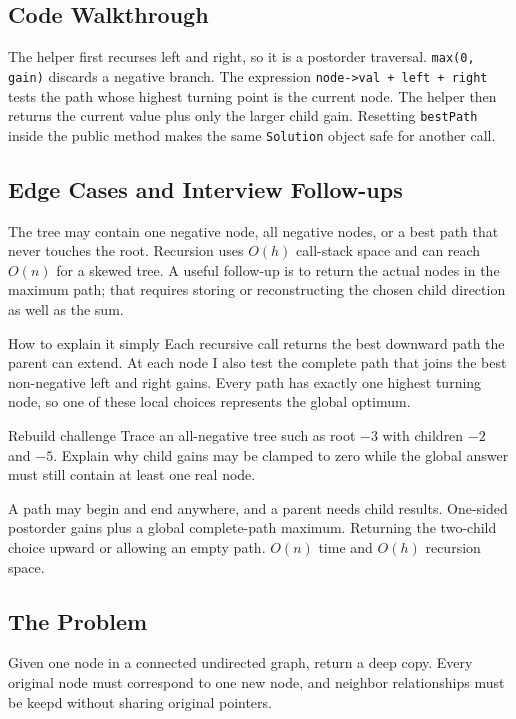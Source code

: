 \subsection{Code Walkthrough}
The helper first recurses left and right, so it is a postorder traversal.
\texttt{max(0, gain)} discards a negative branch. The expression
\texttt{node->val + left + right} tests the path whose highest turning point
is the current node. The helper then returns the current value plus only the
larger child gain. Resetting \texttt{bestPath} inside the public method makes
the same \texttt{Solution} object safe for another call.

\subsection{Edge Cases and Interview Follow-ups}
The tree may contain one negative node, all negative nodes, or a best path
that never touches the root. Recursion uses \(O(h)\) call-stack space and can
reach \(O(n)\) for a skewed tree. A useful follow-up is to return the actual
nodes in the maximum path; that requires storing or reconstructing the chosen
child direction as well as the sum.

\begin{revisionbox}{How to explain it simply}
Each recursive call returns the best downward path the parent can extend. At
each node I also test the complete path that joins the best non-negative left
and right gains. Every path has exactly one highest turning node, so one of
these local choices represents the global optimum.
\end{revisionbox}

\begin{revisionbox}{Rebuild challenge}
Trace an all-negative tree such as root \(-3\) with children \(-2\) and
\(-5\). Explain why child gains may be clamped to zero while the global answer
must still contain at least one real node.
\end{revisionbox}
\chaptercheckpoint
  {A path may begin and end anywhere, and a parent needs child results.}
  {One-sided postorder gains plus a global complete-path maximum.}
  {Returning the two-child choice upward or allowing an empty path.}
  {$O(n)$ time and $O(h)$ recursion space.}
\judgeclassnote



\subsection{The Problem}
Given one node in a connected undirected graph, return a deep copy. Every
original node must correspond to one new node, and neighbor relationships must
be keepd without sharing original pointers.

